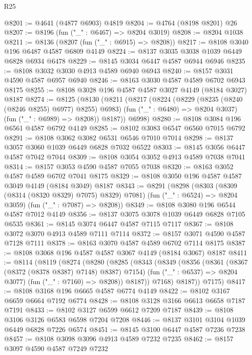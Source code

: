 \begin{lexlean}{R25}
\begin{coremodule}
@8201 := @4641 (@4877 @6903) @4819
@8204 := @4764 (@8198 @8201) @26
@8207 := @8196 (fun ("_" : @6467) => @8204 @3019)
@8208 := @8204 @1038
@8211 := @8136 (@8207 (fun ("_" : @6915) => @8208))
@8217 := @8108 @3040 @196 @6487 @4587 @6809 @4149
@8224 := @8137 @3035 @3038 @1039 @6449 @6828 @6934 @6478
@8229 := @8145 @3034 @6447 @4587 @6944 @6946
@8235 := @8108 @3032 @3030 @4913 @4589 @6940 @6943
@8240 := @8157 @3031 @4590 @4587 @6957 @6940
@8246 := @8163 @3030 @4587 @4589 @6702 @6943 @8175
@8255 := @8108 @3028 @196 @4587 @4587 @3027 @4149 (@8184 @3027) @8187
@8274 := @8125
    (@8130
      (@8211
        (@8217
          (@8224
            (@8229 (@8235 (@8240 (@8246 @8255) @6977) @8255) @6983)
            (fun ("_" : @6480) => @8204 @3037)
            (fun ("_" : @6989) => @8208))
          @8187))
      @6998)
@8280 := @8108 @3084 @196 @6561 @4587 @6792 @4149
@8285 := @8102 @3083 @6547 @6560 @7015 @6792
@8291 := @8108 @3062 @3082 @6531 @6546 @7010 @7014
@8298 := @8137 @3057 @3060 @1039 @6449 @6828 @7032 @6522
@8303 := @8145 @3056 @6447 @4587 @7042 @7044
@8309 := @8108 @3054 @3052 @4913 @4589 @7038 @7041
@8314 := @8157 @3053 @4590 @4587 @7055 @7038
@8320 := @8163 @3052 @4587 @4589 @6702 @7041 @8175
@8329 := @8108 @3050 @196 @4587 @4587 @3049 @4149 (@8184 @3049) @8187
@8343 := @8291
    (@8298
      (@8303 (@8309 (@8314 (@8320 @8329) @7075) @8329) @7081)
      (fun ("_" : @6524) => @8204 @3059)
      (fun ("_" : @7087) => @8208))
@8349 := @8108 @3080 @196 @6544 @4587 @7012 @4149
@8356 := @8137 @3075 @3078 @1039 @6449 @6828 @7105 @6535
@8361 := @8145 @3074 @6447 @4587 @7115 @7117
@8367 := @8108 @3072 @3070 @4913 @4589 @7111 @7114
@8372 := @8157 @3071 @4590 @4587 @7128 @7111
@8378 := @8163 @3070 @4587 @4589 @6702 @7114 @8175
@8387 := @8108 @3068 @196 @4587 @4587 @3067 @4149 (@8184 @3067) @8187
@8411 := @8114
    (@8119
      (@8274
        (@8280
          (@8285
            (@8343
              (@8349
                (@8356
                  (@8361 (@8367 (@8372 (@8378 @8387) @7148) @8387) @7154)
                  (fun ("_" : @6537) => @8204 @3077)
                  (fun ("_" : @7160) => @8208))
                @8187))
            @7168)
          @8187))
      @7175)
@8417 := @8108 @3168 @196 @6665 @4587 @6774 @4149
@8422 := @8102 @3167 @6659 @6664 @7192 @6774
@8428 := @8108 @3128 @3166 @6613 @6658 @7187 @7191
@8433 := @8102 @3127 @6599 @6612 @7209 @7187
@8439 := @8108 @3106 @3126 @6583 @6598 @7204 @7208
@8446 := @8137 @3101 @3104 @1039 @6449 @6828 @7226 @6574
@8451 := @8145 @3100 @6447 @4587 @7236 @7238
@8457 := @8108 @3098 @3096 @4913 @4589 @7232 @7235
@8462 := @8157 @3097 @4590 @4587 @7249 @7232

\end{coremodule}
\end{lexlean}
